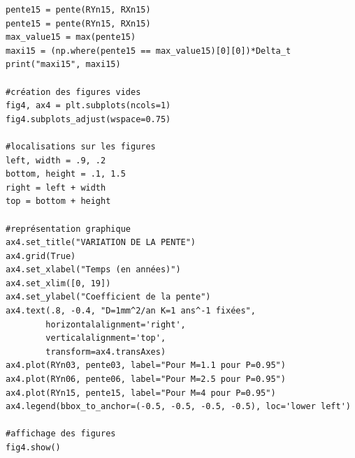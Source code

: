 \documentclass[12pt,a4paper]{article}
\begin{document}
\begin{lstlisting}[style=stylepython]
pente15 = pente(RYn15, RXn15)
pente15 = pente(RYn15, RXn15)
max_value15 = max(pente15)
maxi15 = (np.where(pente15 == max_value15)[0][0])*Delta_t
print("maxi15", maxi15)

#création des figures vides 
fig4, ax4 = plt.subplots(ncols=1)
fig4.subplots_adjust(wspace=0.75)

#localisations sur les figures
left, width = .9, .2
bottom, height = .1, 1.5
right = left + width
top = bottom + height

#représentation graphique 
ax4.set_title("VARIATION DE LA PENTE")
ax4.grid(True)
ax4.set_xlabel("Temps (en années)")
ax4.set_xlim([0, 19])
ax4.set_ylabel("Coefficient de la pente")
ax4.text(.8, -0.4, "D=1mm^2/an K=1 ans^-1 fixées",
        horizontalalignment='right',
        verticalalignment='top',
        transform=ax4.transAxes)
ax4.plot(RYn03, pente03, label="Pour M=1.1 pour P=0.95")
ax4.plot(RYn06, pente06, label="Pour M=2.5 pour P=0.95")
ax4.plot(RYn15, pente15, label="Pour M=4 pour P=0.95")
ax4.legend(bbox_to_anchor=(-0.5, -0.5, -0.5, -0.5), loc='lower left')

#affichage des figures 
fig4.show()
\end{lstlisting}
\\ 
\newpage
\end{document}
